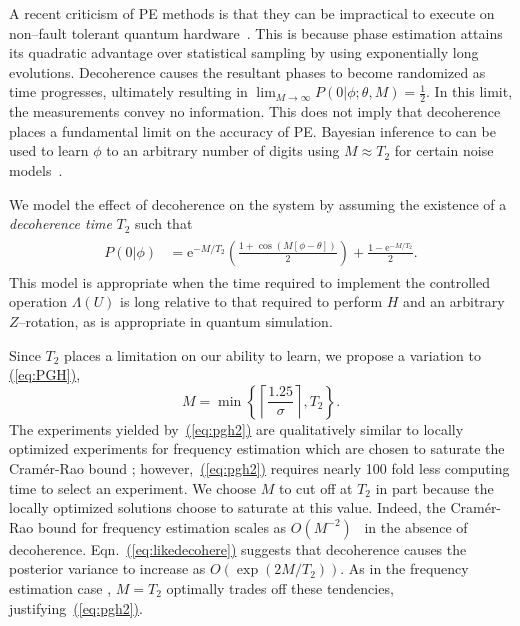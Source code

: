 \documentclass[aps,pra,amsmath,twocolumn,amssymb,superscriptaddress]{revtex4-1}
\newcommand{\eq}[1]{\hyperref[eq:#1]{(\ref*{eq:#1})}}
\newcommand{\ee}{\mathrm{e}}
\begin{document}
A recent criticism of PE methods is that they can be impractical to execute on non--fault tolerant quantum hardware~\cite{PMS+14,MBL+14,WHT15}.  This is because phase estimation attains its quadratic advantage over statistical sampling by using exponentially long evolutions.  Decoherence causes the resultant phases to become randomized as time progresses, ultimately resulting in
$\lim_{M\rightarrow \infty} P(0|\phi;\theta,M) = \frac{1}{2}$.
In this limit, the measurements convey no information.  This does not imply that decoherence places a fundamental limit on the accuracy of PE.   Bayesian inference to can be used to learn $\phi$ to an arbitrary number of digits using $M \approx T_2$ for certain noise models~\cite{granade_robust_2012}.  

We model the effect of decoherence on the system by assuming the existence of a \emph{decoherence time} $T_2$ such that
\begin{gather}
    \label{eq:likedecohere}
    \begin{aligned}
        P(0|\phi) & = \ee^{-M/T_2}\left(\frac{1+\cos(M[\phi -\theta])}{2}\right)+\frac{1-\ee^{-M/T_2}}{2}.
    \end{aligned}
\end{gather}
This model is appropriate when the time required to implement the controlled operation $\Lambda(U)$ is long relative to that required to perform $H$ and an arbitrary $Z$--rotation, as is appropriate in quantum simulation.
 

Since $T_2$ places a limitation on our ability to learn, we propose a variation to \eq{PGH},
\begin{equation}
    \label{eq:pgh2}
    M = \min\left\{\left\lceil\frac{1.25}{\sigma}\right\rceil, T_2 \right\}.
\end{equation}
The experiments yielded by~\eq{pgh2} are qualitatively similar to locally optimized experiments for frequency estimation which are chosen to saturate the Cram\'er-Rao bound \cite{ferrie_how_2013}; however,~\eq{pgh2} requires nearly 100 fold less computing time to select an experiment.
We choose $M$ to cut off at $T_2$ in part because the locally optimized solutions choose to saturate at this value. Indeed, the Cram\'er-Rao bound for frequency estimation scales as $O(M^{-2})$~\cite{WGC15} in the absence of decoherence.  Eqn.~\eq{likedecohere} suggests that decoherence causes the posterior variance to increase as $O(\exp(2M/T_2))$.  As in the frequency estimation case \cite{ferrie_how_2013}, $M=T_2$ optimally trades off these tendencies, justifying~\eq{pgh2}.
\end{document}
